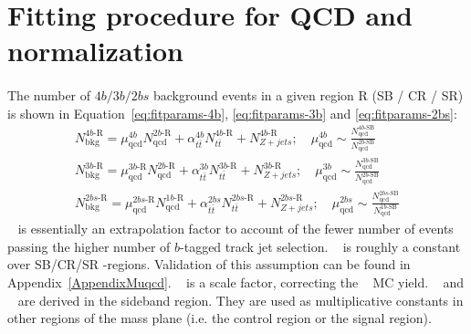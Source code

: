 \section{Fitting procedure for QCD and \ttbar~ normalization}
\label{sec:ttbarnorm}

\paragraph{}
The number of $4b/3b/2bs$ background events in a given region R (SB / CR / SR) is shown in Equation~\ref{eq:fitparams-4b}, \ref{eq:fitparams-3b} and \ref{eq:fitparams-2bs}:
\begin{eqnarray}
\label{eq:fitparams-4b}
N^{4b\text{-R}}_{\text{bkg}} = \mu_{\text{qcd}}^{4b} N^{2b\text{-R}}_{\text{qcd}} + \alpha_{t\bar{t}}^{4b} N^{4b\text{-R}}_{t\bar{t}} + N^{4b\text{-R}}_{Z+jets};
\quad \mu_{\text{qcd}}^{4b} \sim \frac{N^{4b\text{-SB}}_{\text{qcd}}}{N^{2b\text{-SB}}_{\text{qcd}}}
\\
\label{eq:fitparams-3b}
N^{3b\text{-R}}_{\text{bkg}} = \mu_{\text{qcd}}^{3b\text{-R}} N^{2b\text{-R}}_{\text{qcd}} + \alpha_{t\bar{t}}^{3b} N^{3b\text{-R}}_{t\bar{t}} + N^{3b\text{-R}}_{Z+jets} ;
\quad \mu_{\text{qcd}}^{3b} \sim \frac{N^{3b\text{-SB}}_{\text{qcd}}}{N^{2b\text{-SB}}_{\text{qcd}}}\\
\label{eq:fitparams-2bs}
N^{2bs\text{-R}}_{\text{bkg}} = \mu_{\text{qcd}}^{2bs\text{-R}} N^{1b\text{-R}}_{\text{qcd}} + \alpha_{t\bar{t}}^{2bs} N^{2bs\text{-R}}_{t\bar{t}} + N^{2bs\text{-R}}_{Z+jets};
\quad \mu_{\text{qcd}}^{2bs} \sim \frac{N^{2bs\text{-SB}}_{\text{qcd}}}{N^{1b\text{-SB}}_{\text{qcd}}}
\end{eqnarray} 
\muqcd~ is essentially an extrapolation factor to account of the fewer number of events passing the higher number of $b$-tagged track jet selection.
\muqcd~ is roughly a constant over SB/CR/SR \mleadJ-\msublJ regions.
Validation of this assumption can be found in Appendix~\ref{AppendixMuqcd}.
\alphatt~ is a scale factor, correcting the \ttbar~ MC yield.
\muqcd~ and \alphatt~ are derived in the sideband region.
They are used as multiplicative constants in other regions of the mass plane (i.e. the control region or the signal region).

